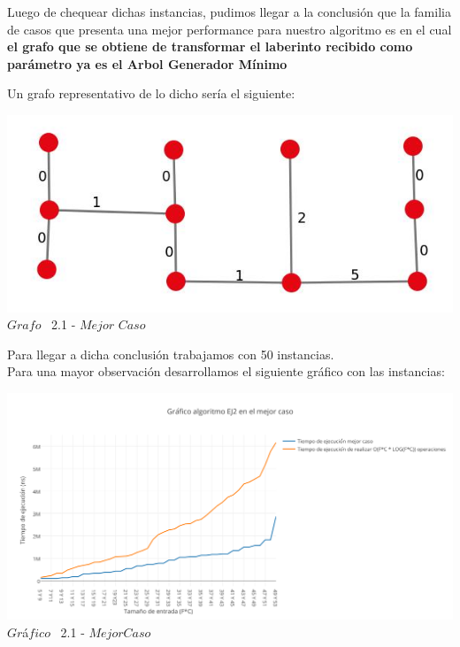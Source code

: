 Luego de chequear dichas instancias, pudimos llegar a la conclusi\'on que la familia de casos que presenta una mejor performance para nuestro algoritmo
es en el cual \textbf{el grafo que se obtiene de transformar el laberinto recibido como par\'ametro ya es el Arbol Generador M\'inimo}

Un grafo representativo de lo dicho ser\'ia el siguiente:

\vspace*{0.3cm} \vspace*{0.3cm}
  \begin{center}
 \includegraphics[scale=0.5]{./EJ2/ej2grafocompleto.jpeg}
 \\{$Grafo$ \ 2.1 - $Mejor$ $Caso$}
  \end{center}
  \vspace*{0.3cm}
  
Para llegar a dicha conclusi\'on trabajamos con 50 instancias.\\

Para una mayor observaci\'on desarrollamos el siguiente gr\'afico con las instancias:\\

\vspace*{0.3cm} \vspace*{0.3cm}
  \begin{center}
 \includegraphics[scale=0.65]{./EJ2/mejorcaso.png}
 {$Gr$\'a$fico$ \ 2.1 - $Mejor Caso$}
  \end{center}
  \vspace*{0.3cm}
  
